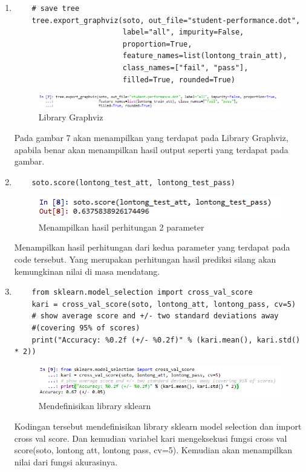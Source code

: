 \begin{enumerate}
\item
\begin{verbatim}
	# save tree
	tree.export_graphviz(soto, out_file="student-performance.dot", 
						 label="all", impurity=False, 
						 proportion=True,
	                     feature_names=list(lontong_train_att), 
	                     class_names=["fail", "pass"], 
	                     filled=True, rounded=True)
\end{verbatim}
\begin{figure}[ht]
\centering
\includegraphics[scale=0.6]{figures/lontong/7.png}
\caption{Library Graphviz}
\end{figure}
\par
	Pada gambar 7 akan menampilkan yang terdapat pada Library Graphviz, apabila benar akan menampilkan hasil output seperti yang terdapat pada gambar.

\item
\begin{verbatim}
	soto.score(lontong_test_att, lontong_test_pass)
\end{verbatim}
\begin{figure}[ht]
\centering
\includegraphics[scale=0.9]{figures/lontong/8.png}
\caption{Menampilkan hasil perhitungan 2 parameter}
\end{figure}
\par
	Menampilkan hasil perhitungan dari kedua parameter yang terdapat pada code tersebut. Yang merupakan perhitungan hasil prediksi silang akan kemungkinan nilai di masa mendatang.

\item
\begin{verbatim}
	from sklearn.model_selection import cross_val_score
	kari = cross_val_score(soto, lontong_att, lontong_pass, cv=5)
	# show average score and +/- two standard deviations away 
	#(covering 95% of scores)
	print("Accuracy: %0.2f (+/- %0.2f)" % (kari.mean(), kari.std() * 2))
\end{verbatim}
\begin{figure}[ht]
\centering
\includegraphics[scale=0.6]{figures/lontong/9.png}
\caption{Mendefinisikan library sklearn}
\end{figure}
\par
	Kodingan tersebut mendefinisikan library sklearn model selection dan import cross val score. Dan kemudian variabel kari mengeksekusi fungsi cross val score(soto, lontong att, lontong pass, cv=5). Kemudian akan menampilkan nilai dari fungsi akurasinya.


\end{enumerate}
